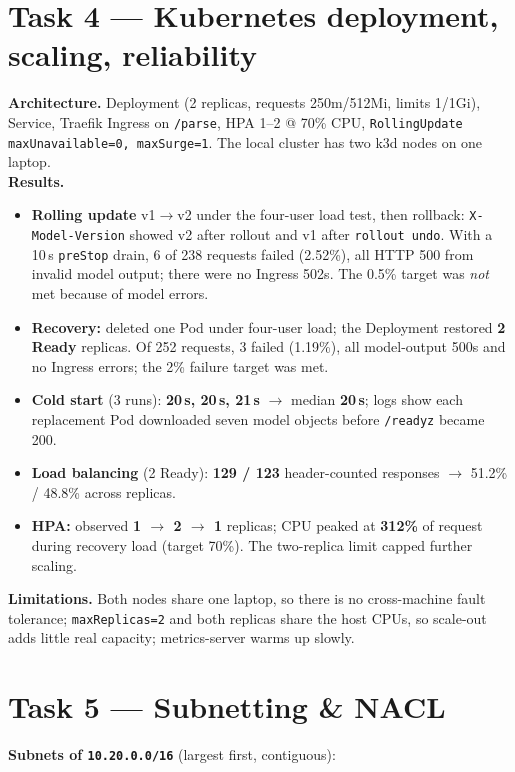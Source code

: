 \documentclass[10pt,a4paper]{article}
\newcommand{\code}[1]{\texttt{\small #1}}
\begin{document}
\section{Task 4 --- Kubernetes deployment, scaling, reliability}
\textbf{Architecture.} Deployment (2 replicas, requests 250m/512Mi, limits 1/1Gi), Service, Traefik Ingress
on \code{/parse}, HPA 1--2 @ 70\% CPU, \code{RollingUpdate maxUnavailable=0, maxSurge=1}. The
local cluster has two k3d nodes on one laptop.\\
\textbf{Results.}
\begin{itemize}
\item \textbf{Rolling update} v1$\rightarrow$v2 under the four-user load test, then rollback:
\code{X-Model-Version} showed v2 after rollout and v1 after \code{rollout undo}. With a 10\,s
\code{preStop} drain, 6 of 238 requests failed (2.52\%), all HTTP 500 from invalid model output;
there were no Ingress 502s. The 0.5\% target was \emph{not} met because of model errors.
\item \textbf{Recovery:} deleted one Pod under four-user load; the Deployment restored \textbf{2 Ready}
replicas. Of 252 requests, 3 failed (1.19\%), all model-output 500s and no Ingress errors; the 2\%
failure target was met.
\item \textbf{Cold start} (3 runs): \textbf{20\,s, 20\,s, 21\,s} $\rightarrow$ median \textbf{20\,s}; logs show
each replacement Pod downloaded seven model objects before \code{/readyz} became 200.
\item \textbf{Load balancing} (2 Ready): \textbf{129 / 123} header-counted responses $\rightarrow$ 51.2\% / 48.8\% across replicas.
\item \textbf{HPA:} observed \textbf{1 $\rightarrow$ 2 $\rightarrow$ 1} replicas; CPU peaked at
\textbf{312\%} of request during recovery load (target 70\%). The two-replica limit capped further scaling.
\end{itemize}
\textbf{Limitations.} Both nodes share one laptop, so there is no cross-machine fault tolerance;
\code{maxReplicas=2} and both replicas share the host CPUs, so scale-out adds little real capacity;
metrics-server warms up slowly.

\section{Task 5 --- Subnetting \& NACL}
\textbf{Subnets of \code{10.20.0.0/16}} (largest first, contiguous):
\end{document}
